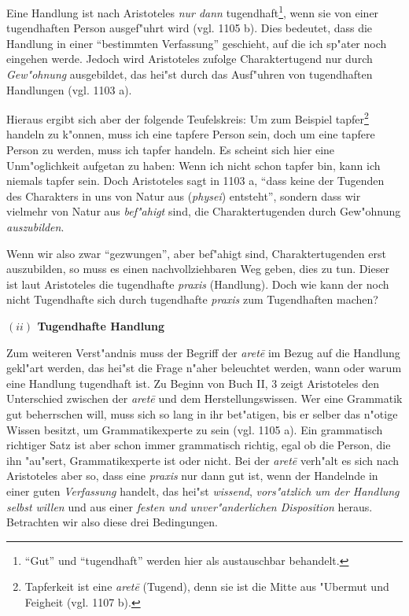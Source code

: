 \documentclass[a4paper, emulatestandardclasses, 12pt]{scrartcl}
\begin{document}
\begin{onehalfspace}
Eine Handlung ist nach Aristoteles \emph{nur dann} tugendhaft\footnote{"`Gut"' und "`tugendhaft"' werden hier als austauschbar behandelt.}, wenn sie von einer tugendhaften Person ausgef"uhrt wird (vgl. 1105 b). Dies bedeutet, dass die Handlung in einer "`bestimmten Verfassung"' geschieht, auf die ich sp"ater noch eingehen werde. Jedoch wird Aristoteles zufolge Charaktertugend nur durch \emph{Gew"ohnung} ausgebildet, das hei"st durch das Ausf"uhren von tugendhaften Handlungen (vgl. 1103 a). 

Hieraus ergibt sich aber der folgende Teufelskreis: Um zum Beispiel tapfer\footnote{Tapferkeit ist eine \emph{aret\={e}} (Tugend), denn sie ist die Mitte aus "Ubermut und Feigheit (vgl. 1107 b).} handeln zu k"onnen, muss ich eine tapfere Person sein, doch um eine tapfere Person zu werden, muss ich tapfer handeln. Es scheint sich hier eine Unm"oglichkeit aufgetan zu haben: Wenn ich nicht schon tapfer bin, kann ich niemals tapfer sein. Doch Aristoteles sagt in 1103 a, "`dass keine der Tugenden des Charakters in uns von Natur aus (\emph{physei}) entsteht"', sondern dass wir vielmehr von Natur aus \emph{bef"ahigt} sind, die Charaktertugenden durch Gew"ohnung \emph{auszubilden}. 

Wenn wir also zwar "`gezwungen"', aber bef"ahigt sind, Charaktertugenden erst auszubilden, so muss es einen nachvollziehbaren Weg geben, dies zu tun. Dieser ist laut Aristoteles die tugendhafte \emph{praxis} (Handlung). Doch wie kann der noch nicht Tugendhafte sich durch tugendhafte \emph{praxis} zum Tugendhaften machen?

\vspace{6mm}
\noindent\textbf{$(ii)$ Tugendhafte Handlung}	

\noindent Zum weiteren Verst"andnis muss der Begriff der \emph{aret\={e}} im Bezug auf die Handlung gekl"art werden, das hei"st die Frage n"aher beleuchtet werden, wann oder warum eine Handlung tugendhaft ist. Zu Beginn von Buch II, 3 zeigt Aristoteles den Unterschied zwischen der \emph{aret\={e}} und dem  Herstellungswissen. Wer eine Grammatik gut beherrschen will, muss sich so lang in ihr bet"atigen, bis er selber das n"otige Wissen besitzt, um Grammatikexperte zu sein (vgl. 1105 a). Ein grammatisch richtiger Satz ist aber schon immer grammatisch richtig, egal ob die Person, die ihn "au"sert, Grammatikexperte ist oder nicht. Bei der \emph{aret\={e}} verh"alt es sich nach Aristoteles aber so, dass eine \emph{praxis} nur dann gut ist, wenn der Handelnde in einer guten \emph{Verfassung} handelt, das hei"st \emph{wissend}, \emph{vors"atzlich um der Handlung selbst willen} und aus einer \emph{festen und unver"anderlichen Disposition} heraus. Betrachten wir also diese drei Bedingungen.


\end{onehalfspace}
\end{document}
